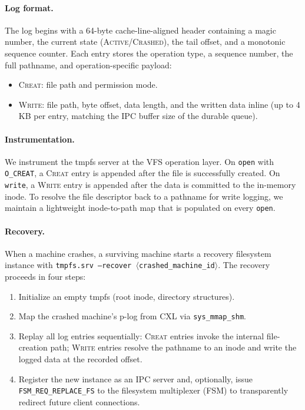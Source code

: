 \paragraph{Log format.}
The log begins with a 64-byte cache-line-aligned header containing a magic
number, the current state (\textsc{Active}/\textsc{Crashed}), the tail offset,
and a monotonic sequence counter.  Each entry stores the operation type, a
sequence number, the full pathname, and operation-specific payload:
%
\begin{itemize}
  \item \textsc{Creat}: file path and permission mode.
  \item \textsc{Write}: file path, byte offset, data length, and the written
        data inline (up to 4\,KB per entry, matching the IPC buffer size of the
        durable queue).
\end{itemize}

\paragraph{Instrumentation.}
We instrument the tmpfs server at the VFS operation layer.  On
\texttt{open} with \texttt{O\_CREAT}, a \textsc{Creat} entry is appended
after the file is successfully created.  On \texttt{write}, a \textsc{Write}
entry is appended after the data is committed to the in-memory inode.  To
resolve the file descriptor back to a pathname for write logging, we maintain
a lightweight inode-to-path map that is populated on every \texttt{open}.

\paragraph{Recovery.}
When a machine crashes, a surviving machine starts a recovery filesystem
instance with \texttt{tmpfs.srv --recover $\langle$crashed\_machine\_id$\rangle$}.
The recovery proceeds in four steps:
%
\begin{enumerate}
  \item Initialize an empty tmpfs (root inode, directory structures).
  \item Map the crashed machine's p-log from CXL via \texttt{sys\_mmap\_shm}.
  \item Replay all log entries sequentially: \textsc{Creat} entries invoke the
        internal file-creation path; \textsc{Write} entries resolve the
        pathname to an inode and write the logged data at the recorded offset.
  \item Register the new instance as an IPC server and, optionally, issue
        \texttt{FSM\_REQ\_REPLACE\_FS} to the filesystem multiplexer (FSM) to
        transparently redirect future client connections.
\end{enumerate}

